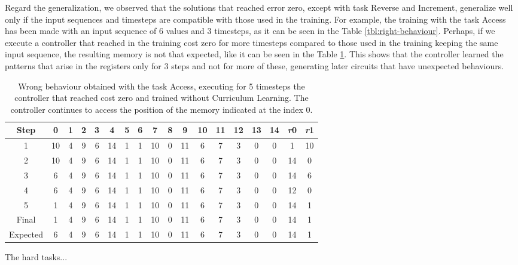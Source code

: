 Regard the generalization, we observed that the solutions that reached error zero, except with task Reverse and Increment, generalize well only if the input sequences and timesteps are compatible with those used in the training. For example, the training with the task Access has been made with an input sequence of 6 values and 3 timesteps, as it can be seen in the Table \ref{tbl:right-behaviour}. Perhaps, if we execute a controller that reached in the training cost zero for more timesteps compared to those used in the training keeping the same input sequence, the resulting memory is not that expected, like it can be seen in the Table \ref{tbl:wrong-behaviour}. This shows that the controller learned the patterns that arise in the registers only for 3 steps and not for more of these, generating later circuits that have unexpected behaviours.\newline
\begin{table}[t]
	\centering
	\begin{tabular}{c|ccccccccccccccc|cc}
		\rowcolor{Gray}\textbf{Step} & 0 & 1 & 2 & 3 & 4 & 5 & 6 & 7 & 8 & 9 & 10 & 11 & 12 & 13 & 14 & \textit{r}0 & \textit{r}1 \\ \hline 
1 & 10 & 4 & 9 & 6 & 14 & 1 & 1 & 10 & 0 & 11 & 6 & 7 & 3 & 0 & 0 & 1 & 10 \\ 
2 & 10 & 4 & 9 & 6 & 14 & 1 & 1 & 10 & 0 & 11 & 6 & 7 & 3 & 0 & 0 & 14 & 0 \\ 
3 & 6 & 4 & 9 & 6 & 14 & 1 & 1 & 10 & 0 & 11 & 6 & 7 & 3 & 0 & 0 & 14 & 6 \\ 
4 & 6 & 4 & 9 & 6 & 14 & 1 & 1 & 10 & 0 & 11 & 6 & 7 & 3 & 0 & 0 & 12 & 0 \\ 
5 & 1 & 4 & 9 & 6 & 14 & 1 & 1 & 10 & 0 & 11 & 6 & 7 & 3 & 0 & 0 & 14 & 1 \\ \hline 
\rowcolor{Gray}Final & 1 & 4 & 9 & 6 & 14 & 1 & 1 & 10 & 0 & 11 & 6 & 7 & 3 & 0 & 0 & 14 & 1 \\
\rowcolor{Gray}Expected & 6 & 4 & 9 & 6 & 14 & 1 & 1 & 10 & 0 & 11 & 6 & 7 & 3 & 0 & 0 & 14 & 1 \\
	\end{tabular}
	\label{tbl:wrong-behaviour}
	\caption{Wrong behaviour obtained with the task Access, executing for 5 timesteps the controller that reached cost zero and trained without Curriculum Learning. The controller continues to access the position of the memory indicated at the index 0.}
\end{table}
The hard tasks...\newline

